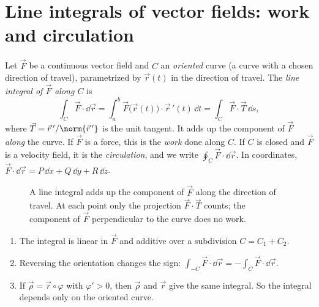 \section{Line integrals of vector fields: work and circulation}

Let $\vec F$ be a continuous vector field and $C$ an \emph{oriented} curve (a curve with a chosen direction of travel), parametrized by $\vec r(t)$ in the direction of travel. The \emph{line integral of $\vec F$ along $C$} is
\[
\int_C\vec F\cdot\dd\vec r=\int_a^b\vec F\bigl(\vec r(t)\bigr)\cdot\vec r\,'(t)\,\dd t=\int_C\vec F\cdot\vec T\,\dd s,
\]
where $\vec T=\vec r\,'/\norm{\vec r\,'}$ is the unit tangent. It adds up the component of $\vec F$ \emph{along} the curve. If $\vec F$ is a force, this is the \emph{work} done along $C$. If $C$ is closed and $\vec F$ is a velocity field, it is the \emph{circulation}, and we write $\oint_C\vec F\cdot\dd\vec r$. In coordinates, $\vec F\cdot\dd\vec r=P\,\dd x+Q\,\dd y+R\,\dd z$.

\begin{figure}[ht]
\centering
{}
\caption{A line integral adds up the component of $\vec F$ along the direction of travel. At each point only the projection $\vec F\cdot\vec T$ counts; the component of $\vec F$ perpendicular to the curve does no work.}
\label{fig:lineint}
\end{figure}

\begin{proposition}\label{prop:lineprops}
\begin{enumerate}[label=(\alph*)]
  \item The integral is linear in $\vec F$ and additive over a subdivision $C=C_1+C_2$.
  \item Reversing the orientation changes the sign: $\int_{-C}\vec F\cdot\dd\vec r=-\int_C\vec F\cdot\dd\vec r$.
  \item If $\vec\rho=\vec r\circ\varphi$ with $\varphi'>0$, then $\vec\rho$ and $\vec r$ give the same integral. So the integral depends only on the oriented curve.
\end{enumerate}
\end{proposition}

